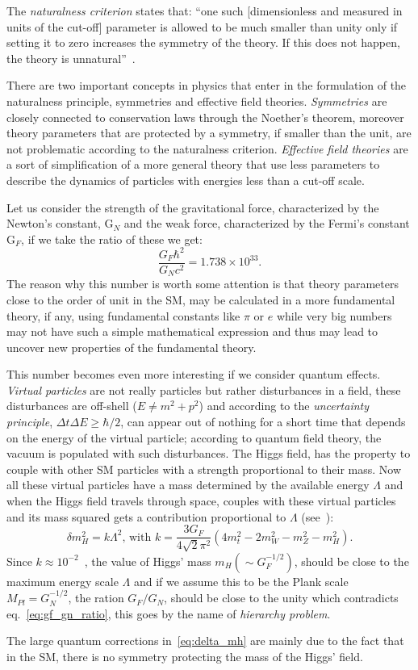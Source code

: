 The \emph{naturalness criterion} states that: ``one such [dimensionless and
measured in units of the cut-off] parameter is allowed to be much smaller than
unity only if setting it to zero increases the symmetry of the theory. If this
does not happen, the theory is unnatural''~\cite{thooft:gauge}.

There are two important concepts in physics that enter in the formulation of the
naturalness principle, symmetries and effective field
theories. \emph{Symmetries} are closely connected to conservation laws through
the Noether's theorem, moreover theory parameters that are protected by a
symmetry, if smaller than the unit, are not problematic according to the
naturalness criterion. \emph{Effective field theories} are a sort of
simplification of a more general theory that use less parameters to describe the
dynamics of particles with energies less than a cut-off scale.

Let us consider the strength of the gravitational force, characterized by the
Newton's constant, G$_N$ and the weak force, characterized by the Fermi's
constant G$_F$, if we take the ratio of these we get:
\begin{equation}
  \label{eq:gf_gn_ratio}
  \frac{G_F \hbar^2}{G_N c^2} = 1.738 \times 10^{33}.
\end{equation}
The reason why this number is worth some attention is that theory parameters
close to the order of unit in the SM, may be calculated in a more fundamental
theory, if any, using fundamental constants like $\pi$ or $e$ while very big
numbers may not have such a simple mathematical expression and thus may lead to
uncover new properties of the fundamental theory.

This number becomes even more interesting if we consider quantum effects.
\emph{Virtual particles} are not really particles but rather disturbances in a
field, these disturbances are off-shell ($E \neq m^2 + p^2$) and according to
the \emph{uncertainty principle}, $\Delta t \Delta E \geq \hbar / 2$, can appear
out of nothing for a short time that depends on the energy of the virtual
particle; according to quantum field theory, the vacuum is populated with such
disturbances. The Higgs field, has the property to couple with other SM
particles with a strength proportional to their mass. Now all these virtual
particles have a mass determined by the available energy $\Lambda$ and when the
Higgs field travels through space, couples with these virtual particles and its
mass squared gets a contribution proportional to $\Lambda$
(see~\cite{Giudice:2008bi}):
\begin{equation}
  \label{eq:delta_mh}
  \delta m_H^2 = k \Lambda^2 \text{, with } k = \frac{3 G_F}{4 \sqrt{2}
    \pi^2}(4m_t^2 - 2m_W^2 - m_Z^2 - m_H^2).
\end{equation}
Since $k \approx 10^{-2}$~\cite{Giudice:2008bi}, the value of Higgs' mass
$m_H (\sim G_F^{-1/2})$, should be close to the maximum energy scale $\Lambda$ and
if we assume this to be the Plank scale $M_{Pl} = G_N^{-1/2}$, the ration
$G_F/G_N$, should be close to the unity which contradicts
eq.~\eqref{eq:gf_gn_ratio}, this goes by the name of \emph{hierarchy problem}.

The large quantum corrections in~\eqref{eq:delta_mh} are mainly due to the fact
that in the SM, there is no symmetry protecting the mass of the Higgs'
field.
